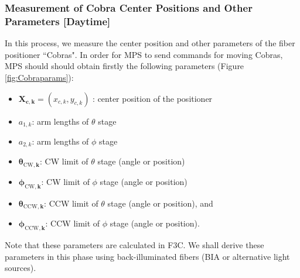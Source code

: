 \subsubsection{Measurement of Cobra Center Positions and Other Parameters [Daytime]}\label{secflow:CobraCal}

In this process, we measure the center position and other parameters of the fiber positioner ``Cobras".
In order for MPS to send commands for moving Cobras, MPS should should obtain firstly the following parameters (Figure \ref{fig:Cobraparams}):
\begin{itemize}
\item $\bm{X_{c,k}}=(x_{c,k}, y_{c,k})$ : center position of the positioner
\item $a_{1,k}$: arm lengths of $\theta$ stage
\item $a_{2,k}$: arm lengths of $\phi$ stage
\item $\bm{\theta _{\mathrm{CW},k}}$: CW limit of $\theta$ stage (angle or position)
\item $\bm{\phi _{\mathrm{CW},k}}$: CW limit of $\phi$ stage (angle or position)
\item $\bm{\theta _{\mathrm{CCW},k}}$: CCW limit of $\theta$ stage (angle or position), and
\item $\bm{\phi_{\mathrm{CCW},k}}$: CCW limit of $\phi$ stage (angle or position).
\end{itemize}
Note that these parameters are calculated in F3C.
We shall derive these parameters in this phase using back-illuminated fibers (BIA or alternative light sources).


\smallskip

